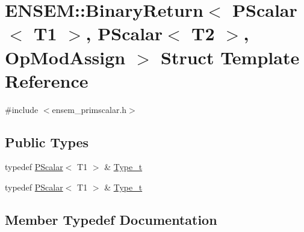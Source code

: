 \hypertarget{structENSEM_1_1BinaryReturn_3_01PScalar_3_01T1_01_4_00_01PScalar_3_01T2_01_4_00_01OpModAssign_01_4}{}\section{E\+N\+S\+EM\+:\+:Binary\+Return$<$ P\+Scalar$<$ T1 $>$, P\+Scalar$<$ T2 $>$, Op\+Mod\+Assign $>$ Struct Template Reference}
\label{structENSEM_1_1BinaryReturn_3_01PScalar_3_01T1_01_4_00_01PScalar_3_01T2_01_4_00_01OpModAssign_01_4}


{\ttfamily \#include $<$ensem\+\_\+primscalar.\+h$>$}

\subsection*{Public Types}
\begin{DoxyCompactItemize}
\item 
typedef \mbox{\hyperlink{classENSEM_1_1PScalar}{P\+Scalar}}$<$ T1 $>$ \& \mbox{\hyperlink{structENSEM_1_1BinaryReturn_3_01PScalar_3_01T1_01_4_00_01PScalar_3_01T2_01_4_00_01OpModAssign_01_4_a5881ef2b7460fedecc7cdf20e5f36799}{Type\+\_\+t}}
\item 
typedef \mbox{\hyperlink{classENSEM_1_1PScalar}{P\+Scalar}}$<$ T1 $>$ \& \mbox{\hyperlink{structENSEM_1_1BinaryReturn_3_01PScalar_3_01T1_01_4_00_01PScalar_3_01T2_01_4_00_01OpModAssign_01_4_a5881ef2b7460fedecc7cdf20e5f36799}{Type\+\_\+t}}
\end{DoxyCompactItemize}


\subsection{Member Typedef Documentation}
\mbox{\label{structENSEM_1_1BinaryReturn_3_01PScalar_3_01T1_01_4_00_01PScalar_3_01T2_01_4_00_01OpModAssign_01_4_a5881ef2b7460fedecc7cdf20e5f36799}} 
